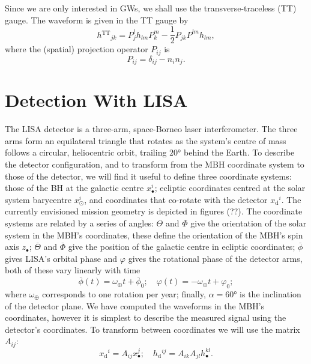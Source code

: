 \documentclass[a4paper, 11pt, titlepage, twoside]{report}
\newcommand{\sub}[1]{\ensuremath{_\mathrm{#1}}}
\newcommand{\super}[1]{\ensuremath{^\mathrm{#1}}}
\newcommand{\recip}[1]{\ensuremath{\frac{1}{#1}}}
\begin{document}
Since we are only interested in GWs, we shall use the transverse-traceless (TT) gauge. The waveform is given in the TT gauge by\cite{Misner1973}
\begin{equation}
{h\super{TT}}_{jk} = P^l_jh_{lm}P^m_k - \recip{2}P_{jk}P^{lm}h_{lm},
\end{equation}
where the (spatial) projection operator $P_{ij}$ is
\begin{equation}
P_{ij} = \delta_{ij} - n_in_j.
\end{equation}

\section{Detection With LISA}

The LISA detector is a three-arm, space-Borneo laser interferometer\cite{Bender1998, Danzmann2003}. The three arms form an equilateral triangle that rotates as the system's centre of mass follows a circular, heliocentric orbit, trailing $\ang{20}$ behind the Earth. To describe the detector configuration, and to transform from the MBH coordinate system to those of the detector, we will find it useful to define three coordinate systems: those of the BH at the galactic centre $x_\bullet^i$; ecliptic coordinates centred at the solar system barycentre $x_\odot^i$, and coordinates that co-rotate with the detector $x\sub{d}^i$. The currently envisioned mission geometry is depicted in figures (??). The coordinate systems are related by a series of angles: $\Theta$ and $\Phi$ give the orientation of the solar system in the MBH's coordinates, these define the orientation of the MBH's spin axis $z_\bullet$; $\overline{\Theta}$ and $\overline{\Phi}$ give the position of the galactic centre in ecliptic coordinates; $\overline{\phi}$ gives LISA's orbital phase and $\varphi$ gives the rotational phase of the detector arms, both of these vary linearly with time
\begin{equation}
\overline{\phi}(t) = \omega_\oplus t + \overline{\phi}_0; \quad \varphi(t) = -\omega_\oplus t + \varphi_0;
\end{equation}
where $\omega_\oplus$ corresponds to one rotation per year; finally, $\alpha = \ang{60}$ is the inclination of the detector plane. We have computed the waveforms in the MBH's coordinates, however it is simplest to describe the measured signal using the detector's coordinates. To transform between coordinates we will use the matrix $A_{ij}$:
\begin{equation}
x\sub{d}^i = A_{ij}x_\bullet^j; \quad h\sub{d}^{ij} = A_{ik}A_{jl}h_\bullet^{kl}.
\end{equation}
\end{document}
